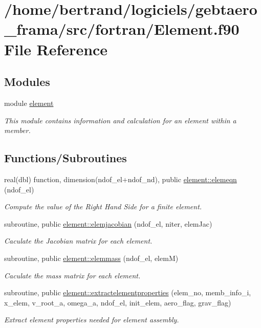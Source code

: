 \hypertarget{_element_8f90}{}\section{/home/bertrand/logiciels/gebtaero\+\_\+frama/src/fortran/\+Element.f90 File Reference}
\label{_element_8f90}
\subsection*{Modules}
\begin{DoxyCompactItemize}
\item 
module \hyperlink{namespaceelement}{element}
\begin{DoxyCompactList}\small\item\em This module contains information and calculation for an element within a member. \end{DoxyCompactList}\end{DoxyCompactItemize}
\subsection*{Functions/\+Subroutines}
\begin{DoxyCompactItemize}
\item 
real(dbl) function, dimension(ndof\+\_\+el+ndof\+\_\+nd), public \hyperlink{namespaceelement_a267c29ec99208b5121ba2c6af7180016}{element\+::elemeqn} (ndof\+\_\+el)
\begin{DoxyCompactList}\small\item\em Compute the value of the Right Hand Side for a finite element. \end{DoxyCompactList}\item 
subroutine, public \hyperlink{namespaceelement_a172c175acb51f133e8b15a64c6e7f238}{element\+::elemjacobian} (ndof\+\_\+el, niter, elem\+Jac)
\begin{DoxyCompactList}\small\item\em Caculate the Jacobian matrix for each element. \end{DoxyCompactList}\item 
subroutine, public \hyperlink{namespaceelement_aeac4f943f8f4e225381fac5a1278d4eb}{element\+::elemmass} (ndof\+\_\+el, elemM)
\begin{DoxyCompactList}\small\item\em Caculate the mass matrix for each element. \end{DoxyCompactList}\item 
subroutine, public \hyperlink{namespaceelement_aa0f853882f2705c359567e433bb31fe9}{element\+::extractelementproperties} (elem\+\_\+no, memb\+\_\+info\+\_\+i, x\+\_\+elem, v\+\_\+root\+\_\+a, omega\+\_\+a, ndof\+\_\+el, init\+\_\+elem, aero\+\_\+flag, grav\+\_\+flag)
\begin{DoxyCompactList}\small\item\em Extract element properties needed for element assembly. \end{DoxyCompactList}\end{DoxyCompactItemize}
